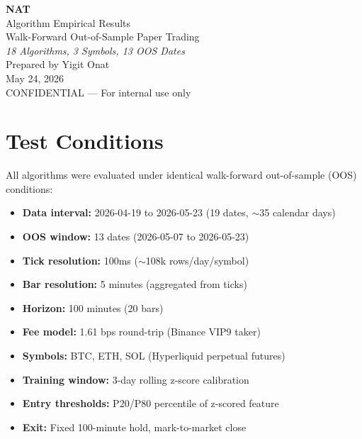 \documentclass[11pt,a4paper]{article}
\begin{document}
\begin{titlepage}
\centering
\vspace*{3cm}
{\Huge\bfseries NAT\\[0.3cm]}
{\LARGE Algorithm Empirical Results\\[0.5cm]}
{\Large Walk-Forward Out-of-Sample Paper Trading\\[0.3cm]}
{\large \textit{18 Algorithms, 3 Symbols, 13 OOS Dates}\\[2cm]}
{\large Prepared by Yigit Onat\\[0.3cm]}
{\large May 24, 2026\\[3cm]}
\vfill
{\small CONFIDENTIAL --- For internal use only}
\end{titlepage}

\tableofcontents
\newpage

\section{Test Conditions}

All algorithms were evaluated under identical walk-forward out-of-sample (OOS) conditions:

\begin{itemize}
    \item \textbf{Data interval:} 2026-04-19 to 2026-05-23 (19 dates, $\sim$35 calendar days)
    \item \textbf{OOS window:} 13 dates (2026-05-07 to 2026-05-23)
    \item \textbf{Tick resolution:} 100ms ($\sim$108k rows/day/symbol)
    \item \textbf{Bar resolution:} 5 minutes (aggregated from ticks)
    \item \textbf{Horizon:} 100 minutes (20 bars)
    \item \textbf{Fee model:} 1.61 bps round-trip (Binance VIP9 taker)
    \item \textbf{Symbols:} BTC, ETH, SOL (Hyperliquid perpetual futures)
    \item \textbf{Training window:} 3-day rolling z-score calibration
    \item \textbf{Entry thresholds:} P20/P80 percentile of z-scored feature
    \item \textbf{Exit:} Fixed 100-minute hold, mark-to-market close
\end{itemize}
\end{document}
